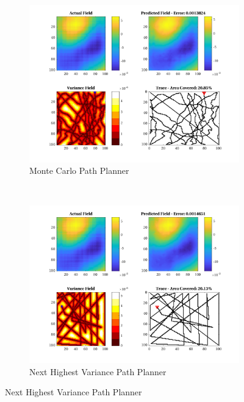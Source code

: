 \begin{figure}[htb!]
    \centering
    \begin{subfigure}[t]{0.5\textwidth}
        \centering
        \includegraphics[width=\linewidth]{figures/hbresults/mc_20p_100x100_sf_25_seed_3.png}
        \captionsetup{skip=0.10\baselineskip,size=footnotesize}
        \caption{Monte Carlo Path Planner}
    \end{subfigure}%
    ~ 
    \begin{subfigure}[t]{0.5\textwidth}
        \centering
        \includegraphics[width=\linewidth]{figures/hbresults/nhv_20p_100x100_sf_25_seed_3.png}
        \captionsetup{skip=0.10\baselineskip,size=footnotesize}
        \caption{Next Highest Variance Path Planner}

\end{subfigure}
\end{figure}
